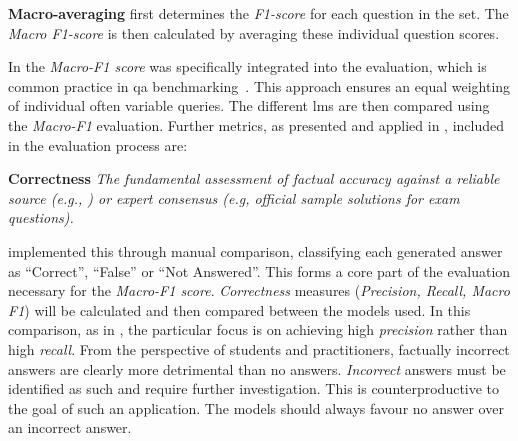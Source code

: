 \textbf{Macro-averaging} first determines the \textit{F1-score} for each question in the set.
The \textit{Macro F1-score} is then calculated by averaging these individual question scores.
%

%
In \citet{Paul_Keller} the \textit{Macro-F1 score} was specifically integrated into the evaluation, which is common practice in \ac{qa} benchmarking~\citep{Usbeck2019benchmarkingqasystems}.
This approach ensures an equal weighting of individual often variable queries.
%
The different \acp{lm} are then compared using the \textit{Macro-F1} evaluation.
Further metrics, as presented and applied in \citet{Paul_Keller}, included in the evaluation process are:
%

%
\noindent\textbf{Correctness}\label{def:correctness_approach}\newline
\textit{The fundamental assessment of factual accuracy against a reliable source (e.g., \citet{bb2}) or expert consensus (e.g, official sample solutions for exam questions).}

\citet{Paul_Keller} implemented this through manual comparison, classifying each generated answer as \enquote{Correct}, \enquote{False} or \enquote{Not Answered}.
This forms a core part of the evaluation necessary for the \textit{Macro-F1 score}.
%
\textit{Correctness} measures (\textit{Precision, Recall, Macro F1}) will be calculated and then compared between the models used.
In this comparison, as in \citet{Paul_Keller}, the particular focus is on achieving high \textit{precision} rather than high \textit{recall}.
From the perspective of students and practitioners, factually incorrect answers are clearly more detrimental than no answers.
\textit{Incorrect} answers must be identified as such and require further investigation.
This is counterproductive to the goal of such an application.
The models should always favour no answer over an incorrect answer.
%

